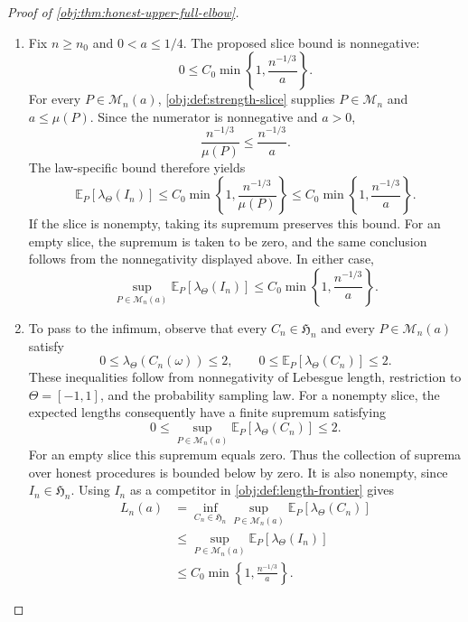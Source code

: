 \begin{proof}[Proof of \cref{obj:thm:honest-upper-full-elbow}]
\begin{enumerate}
\item
Fix \(n\ge n_0\) and \(0<a\le1/4\).
The proposed slice bound is nonnegative:
\[
0\le C_0\min\left\{1,\frac{n^{-1/3}}a\right\}.
\]
For every \(P\in\mathcal M_n(a)\),
\cref{obj:def:strength-slice} supplies \(P\in\mathcal M_n\) and
\(a\le\mu(P)\). Since the numerator is nonnegative and \(a>0\),
\[
\frac{n^{-1/3}}{\mu(P)}\le\frac{n^{-1/3}}a.
\]
The law-specific bound therefore yields
\[
\mathbb E_P[\lambda_\Theta(I_n)]
\le
C_0\min\left\{1,\frac{n^{-1/3}}{\mu(P)}\right\}
\le
C_0\min\left\{1,\frac{n^{-1/3}}a\right\}.
\]
If the slice is nonempty, taking its supremum preserves this bound.
For an empty slice, the supremum is taken to be zero, and the same
conclusion follows from the nonnegativity displayed above. In either case,
\[
\sup_{P\in\mathcal M_n(a)}
\mathbb E_P[\lambda_\Theta(I_n)]
\le
C_0\min\left\{1,\frac{n^{-1/3}}a\right\}.
\]

\item
To pass to the infimum, observe that every
\(C_n\in\mathfrak H_n\) and every \(P\in\mathcal M_n(a)\) satisfy
\[
0\le\lambda_\Theta(C_n(\omega))\le2,
\qquad
0\le\mathbb E_P[\lambda_\Theta(C_n)]\le2.
\]
These inequalities follow from nonnegativity of Lebesgue length,
restriction to \(\Theta=[-1,1]\), and the probability sampling law.
For a nonempty slice, the expected lengths consequently have a finite
supremum satisfying
\[
0\le
\sup_{P\in\mathcal M_n(a)}
\mathbb E_P[\lambda_\Theta(C_n)]
\le2.
\]
For an empty slice this supremum equals zero. Thus the collection of
suprema over honest procedures is bounded below by zero. It is also
nonempty, since \(I_n\in\mathfrak H_n\). Using \(I_n\) as a competitor in
\cref{obj:def:length-frontier} gives
\[
\begin{aligned}
L_n(a)
&=
\inf_{C_n\in\mathfrak H_n}
\sup_{P\in\mathcal M_n(a)}
\mathbb E_P[\lambda_\Theta(C_n)]\\
&\le
\sup_{P\in\mathcal M_n(a)}
\mathbb E_P[\lambda_\Theta(I_n)]\\
&\le
C_0\min\left\{1,\frac{n^{-1/3}}a\right\}.
\end{aligned}
\]
\end{enumerate}
\end{proof}

